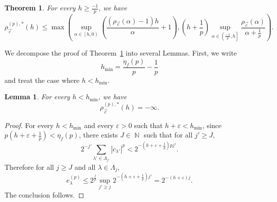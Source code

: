 \documentclass[a4paper,11pt,oneside]{article}
\DeclareMathOperator{\N}{\mathbb{N}}
\newcommand{\coint}[1]{\left[{#1}\right)}
\newcommand{\ocint}[1]{\left({#1}\right]}
\newcommand{\modu}[1]{\left\vert{#1}\right\vert}
\theoremstyle{definition}
\theoremstyle{plain}
\newtheorem{thm}[defi]{Theorem}
\newtheorem{lemma}[defi]{Lemma}
\begin{document}
\begin{thm}\label{petitsoleil}
For every $h\geq\frac{-1}{p}$, we have
\[
\rho_{\vec{c}}^{(p),\ast}(h)\leq\max\left(\sup_{\alpha\in\coint{h,0}}\left(\frac{(\rho_{\vec{c}}(\alpha)-1)h}{\alpha}+1\right),\left(h+\frac{1}{p}\right)\sup_{\alpha\in\ocint{\frac{-1}{p},h}}\frac{\rho_{\vec{c}}(\alpha)}{\alpha+\frac{1}{p}}\right).
\]
\end{thm}

We decompose the proof of Theorem~\ref{petitsoleil} into several Lemmas. First, we write 
\[
h_{\min}=\frac{\eta_f(p)}{p}-\frac{1}{p}
\]
and treat the case where $h<h_{\min}$.

\begin{lemma}\label{lm:small_h}
For every $h<h_{\min}$, we have
\[
\rho_{\vec{c}}^{(p),\ast}(h)=-\infty.
\]
\end{lemma}

\begin{proof}
For every $h<h_{\min}$ and every $\varepsilon>0$ such that $h+\varepsilon<h_{\min}$, since $p\left(h+\varepsilon+\frac{1}{p}\right)<\eta_f(p)$, there exists $J\in\N$ such that for all $j'\geq J$, 
\[
2^{-j'}\sum_{\lambda'\in\Lambda_{j'}}\modu{c_{\lambda'}}^p<2^{-\left(h+\varepsilon+\frac{1}{p}\right)pj'}.
\]
Therefore for all $j\geq J$ and all $\lambda\in\Lambda_j$,
\[
e_\lambda^{(p)}\leq2^{\frac{j}{p}}\sup_{j'\geq j}2^{-\left(h+\varepsilon+\frac{1}{p}\right)j'}=2^{-(h+\varepsilon)j}.
\]
The conclusion follows. 
\end{proof}
\end{document}
